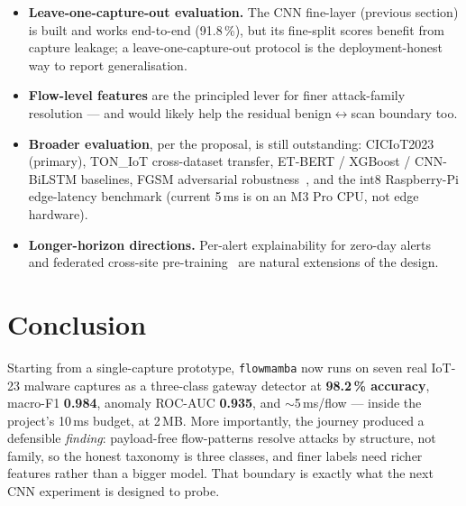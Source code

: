 \documentclass[11pt,a4paper]{article}
\newcommand{\hd}[1]{\textbf{\textcolor{accent}{#1}}}
\begin{document}
\begin{itemize}[leftmargin=1.4em,itemsep=2pt,topsep=2pt]
\item \hd{Leave-one-capture-out evaluation.} The CNN fine-layer (previous section)
is built and works end-to-end (91.8\,\%), but its fine-split scores benefit from
capture leakage; a leave-one-capture-out protocol is the deployment-honest way to
report generalisation.
\item \hd{Flow-level features} are the principled lever for finer attack-family
resolution --- and would likely help the residual benign$\leftrightarrow$scan
boundary too.
\item \hd{Broader evaluation}, per the proposal, is still outstanding:
CICIoT2023~\cite{ciciot} (primary), TON\_IoT cross-dataset transfer, ET-BERT / XGBoost /
CNN-BiLSTM baselines, FGSM adversarial robustness~\cite{advids}, and the int8 Raspberry-Pi
edge-latency benchmark (current 5\,ms is on an M3 Pro CPU, not edge hardware).
\item \hd{Longer-horizon directions.} Per-alert explainability for zero-day
alerts~\cite{xai} and federated cross-site pre-training~\cite{flids,peiotds} are
natural extensions of the design.
\end{itemize}

\section{Conclusion}

Starting from a single-capture prototype, \texttt{flowmamba} now runs on seven
real IoT-23 malware captures as a three-class gateway detector at
\textbf{98.2\,\% accuracy}, macro-F1 \textbf{0.984}, anomaly ROC-AUC
\textbf{0.935}, and $\sim$5\,ms/flow --- inside the project's 10\,ms budget, at
2\,MB. More importantly, the journey produced a defensible \emph{finding}:
payload-free flow-patterns resolve attacks by structure, not family, so the
honest taxonomy is three classes, and finer labels need richer features rather
than a bigger model. That boundary is exactly what the next CNN experiment is
designed to probe.
\end{document}
